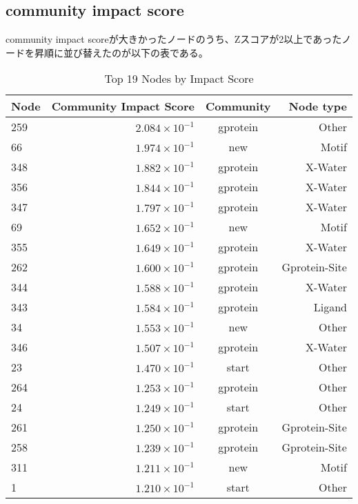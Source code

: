 \subsection{community impact score}
community impact scoreが大きかったノードのうち、Zスコアが2以上であったノードを昇順に並び替えたのが以下の表である。
\begin{table}[ht]
    \centering
    \begin{tabular}{|l|r|c|r|}
    \hline
    \textbf{Node} & \textbf{Community Impact Score} & \textbf{Community} & \textbf{Node type}\\
    \hline
    259 & \( 2.084 \times 10^{-1} \) & gprotein & Other \\
    66 & \( 1.974 \times 10^{-1} \) & new & Motif \\
    348 & \( 1.882 \times 10^{-1} \) & gprotein & X-Water \\
    356 & \( 1.844 \times 10^{-1} \) & gprotein & X-Water \\
    347 & \( 1.797 \times 10^{-1} \) & gprotein & X-Water \\
    69 & \( 1.652 \times 10^{-1} \) & new & Motif \\
    355 & \( 1.649 \times 10^{-1} \) & gprotein & X-Water \\
    262 & \( 1.600 \times 10^{-1} \) & gprotein & Gprotein-Site \\
    344 & \( 1.588 \times 10^{-1} \) & gprotein & X-Water \\
    343 & \( 1.584 \times 10^{-1} \) & gprotein & Ligand \\
    34 & \( 1.553 \times 10^{-1} \) & new & Other \\
    346 & \( 1.507 \times 10^{-1} \) & gprotein & X-Water \\
    23 & \( 1.470 \times 10^{-1} \) & start & Other \\
    264 & \( 1.253 \times 10^{-1} \) & gprotein & Other \\
    24 & \( 1.249 \times 10^{-1} \) & start & Other \\
    261 & \( 1.250 \times 10^{-1} \) & gprotein & Gprotein-Site \\
    258 & \( 1.239 \times 10^{-1} \) & gprotein & Gprotein-Site \\
    311 & \( 1.211 \times 10^{-1} \) & new & Motif \\
    1 & \( 1.210 \times 10^{-1} \) & start & Other \\
    \hline
    \end{tabular}
    \caption{Top 19 Nodes by Impact Score}
\end{table}
  
